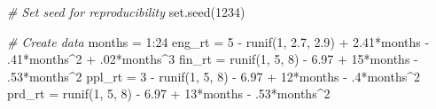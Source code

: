 \documentclass[
]{book}
\newenvironment{Shaded}{\begin{snugshade}}{\end{snugshade}}
\newcommand{\CommentTok}[1]{\textcolor[rgb]{0.56,0.35,0.01}{\textit{#1}}}
\newcommand{\DecValTok}[1]{\textcolor[rgb]{0.00,0.00,0.81}{#1}}
\newcommand{\FloatTok}[1]{\textcolor[rgb]{0.00,0.00,0.81}{#1}}
\newcommand{\FunctionTok}[1]{\textcolor[rgb]{0.00,0.00,0.00}{#1}}
\newcommand{\NormalTok}[1]{#1}
\newcommand{\OtherTok}[1]{\textcolor[rgb]{0.56,0.35,0.01}{#1}}
\newcommand{\SpecialCharTok}[1]{\textcolor[rgb]{0.00,0.00,0.00}{#1}}
\begin{document}
\begin{Shaded}
\begin{Highlighting}[]
\CommentTok{\# Set seed for reproducibility}
\FunctionTok{set.seed}\NormalTok{(}\DecValTok{1234}\NormalTok{)}

\CommentTok{\# Create data}
\NormalTok{months }\OtherTok{=} \DecValTok{1}\SpecialCharTok{:}\DecValTok{24}
\NormalTok{eng\_rt }\OtherTok{=} \DecValTok{5} \SpecialCharTok{{-}} \FunctionTok{runif}\NormalTok{(}\DecValTok{1}\NormalTok{, }\FloatTok{2.7}\NormalTok{, }\FloatTok{2.9}\NormalTok{) }\SpecialCharTok{+} \FloatTok{2.41}\SpecialCharTok{*}\NormalTok{months }\SpecialCharTok{{-}}\NormalTok{ .}\DecValTok{41}\SpecialCharTok{*}\NormalTok{months}\SpecialCharTok{\^{}}\DecValTok{2} \SpecialCharTok{+}\NormalTok{ .}\DecValTok{02}\SpecialCharTok{*}\NormalTok{months}\SpecialCharTok{\^{}}\DecValTok{3}
\NormalTok{fin\_rt }\OtherTok{=} \FunctionTok{runif}\NormalTok{(}\DecValTok{1}\NormalTok{, }\DecValTok{5}\NormalTok{, }\DecValTok{8}\NormalTok{) }\SpecialCharTok{{-}} \FloatTok{6.97} \SpecialCharTok{+} \DecValTok{15}\SpecialCharTok{*}\NormalTok{months }\SpecialCharTok{{-}}\NormalTok{ .}\DecValTok{53}\SpecialCharTok{*}\NormalTok{months}\SpecialCharTok{\^{}}\DecValTok{2}
\NormalTok{ppl\_rt }\OtherTok{=} \DecValTok{3} \SpecialCharTok{{-}} \FunctionTok{runif}\NormalTok{(}\DecValTok{1}\NormalTok{, }\DecValTok{5}\NormalTok{, }\DecValTok{8}\NormalTok{) }\SpecialCharTok{{-}} \FloatTok{6.97} \SpecialCharTok{+} \DecValTok{12}\SpecialCharTok{*}\NormalTok{months }\SpecialCharTok{{-}}\NormalTok{ .}\DecValTok{4}\SpecialCharTok{*}\NormalTok{months}\SpecialCharTok{\^{}}\DecValTok{2}
\NormalTok{prd\_rt }\OtherTok{=} \FunctionTok{runif}\NormalTok{(}\DecValTok{1}\NormalTok{, }\DecValTok{5}\NormalTok{, }\DecValTok{8}\NormalTok{) }\SpecialCharTok{{-}} \FloatTok{6.97} \SpecialCharTok{+} \DecValTok{13}\SpecialCharTok{*}\NormalTok{months }\SpecialCharTok{{-}}\NormalTok{ .}\DecValTok{53}\SpecialCharTok{*}\NormalTok{months}\SpecialCharTok{\^{}}\DecValTok{2}


\end{Highlighting}
\end{Shaded}
\end{document}
